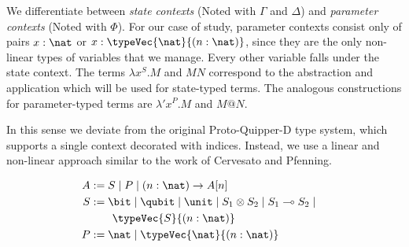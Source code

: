 We differentiate between \textit{state contexts} (Noted with $\Gamma$ and $\Delta$) and \textit{parameter contexts} (Noted with $\Phi$). For our case of study, parameter contexts consist only of pairs $x:\nat$ or $x:\typeVec{\nat}{(n:\nat)}$, since they are the only non-linear types of variables that we manage. Every other variable falls under the state context. The terms $\lambda x^S. M$ and $MN$ correspond to the abstraction and application which will be used for state-typed terms. The analogous constructions for parameter-typed terms are $\lambda' x^P. M$ and $M@N$.

In this sense we deviate from the original Proto-Quipper-D type system, which supports a single context decorated with indices. Instead, we use a linear and non-linear approach similar to the work of Cervesato and Pfenning\cite{Cervesato1996ALL}.



\begin{table}
    \begin{align*}
        A &:= S \;|\; P \;|\; (n: \nat) \to A[n]&\\
        S &:= \bit \;|\; \qubit \;|\;\unit \;|\; S_1 \otimes S_2 \;|\; S_1 \multimap S_2 \;|&\\
        & \qquad\typeVec{S}{(n: \nat)}&\\
        P &:= \nat \;|\; \typeVec{\nat}{(n: \nat)}&
    \end{align*}
    \caption{Type Grammar}
\end{table}

